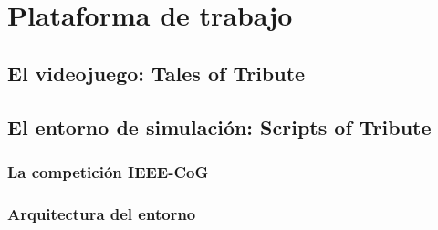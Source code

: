 \chapter{Plataforma de trabajo} \label{chap:plataforma_trabajo}


\section{El videojuego: Tales of Tribute} \label{sec:tales_of_tribute}


\section{El entorno de simulación: Scripts of Tribute} \label{sec:scripts_of_tribute}


\subsection{La competición IEEE-CoG} \label{sec:competicion_ieee_cog}


\subsection{Arquitectura del entorno} \label{sec:arquitectura_entorno}
